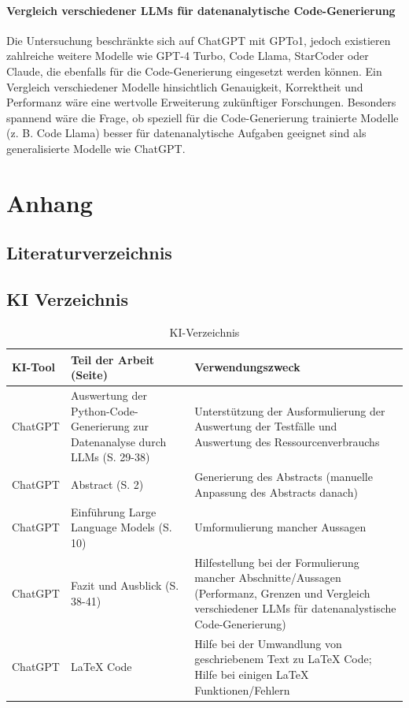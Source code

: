 \documentclass[11pt,a4paper]{article}
\begin{document}
\paragraph{Vergleich verschiedener LLMs für datenanalytische Code-Generierung}
Die Untersuchung beschränkte sich auf ChatGPT mit GPTo1, jedoch existieren zahlreiche weitere Modelle wie GPT-4 Turbo, Code Llama, StarCoder oder Claude, die ebenfalls für die Code-Generierung eingesetzt werden können. Ein Vergleich verschiedener Modelle hinsichtlich Genauigkeit, Korrektheit und Performanz wäre eine wertvolle Erweiterung zukünftiger Forschungen.
Besonders spannend wäre die Frage, ob speziell für die Code-Generierung trainierte Modelle (z. B. Code Llama) besser für datenanalytische Aufgaben geeignet sind als generalisierte Modelle wie ChatGPT.

\newpage
\section{Anhang}
\label{sec:anhang}
\subsection{Literaturverzeichnis}
\printbibliography
\newpage
\subsection{KI Verzeichnis}
\label{sec:anhang_ki}
\begin{table}[h!]
    \centering
    \caption{KI-Verzeichnis}
    \label{tab:ki_verzeichnis}
    \begin{tabularx}{\textwidth}{|l|X|X|}
    \hline
    \textbf{KI-Tool} & \textbf{Teil der Arbeit (Seite)} & \textbf{Verwendungszweck} \\
    \hline
    ChatGPT & Auswertung der Python-Code-Generierung zur Datenanalyse durch LLMs (S. 29-38) & Unterstützung der Ausformulierung der Auswertung der Testfälle und Auswertung des Ressourcenverbrauchs \\
    \hline
    ChatGPT & Abstract (S. 2) & Generierung des Abstracts (manuelle Anpassung des Abstracts danach)\\
    \hline
    ChatGPT & Einführung Large Language Models (S. 10) & Umformulierung mancher Aussagen \\
    \hline
    ChatGPT & Fazit und Ausblick (S. 38-41) & Hilfestellung bei der Formulierung mancher Abschnitte/Aussagen (Performanz, Grenzen und Vergleich verschiedener LLMs für datenanalystische Code-Generierung) \\
    \hline
    ChatGPT & LaTeX Code & Hilfe bei der Umwandlung von geschriebenem Text zu LaTeX Code; Hilfe bei einigen LaTeX Funktionen/Fehlern \\
    \hline
    \end{tabularx}
\end{table}
\newpage
\end{document}
